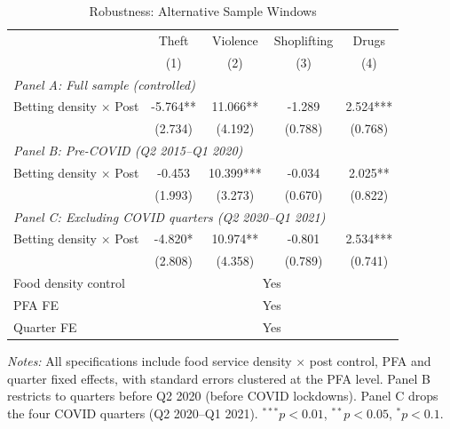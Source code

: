 \begin{table}[htbp]
\centering
\caption{Robustness: Alternative Sample Windows}
\label{tab:robust}
\begin{threeparttable}
\begin{tabular}{lcccc}
\toprule
 & Theft & Violence & Shoplifting & Drugs \\
 & (1) & (2) & (3) & (4) \\
\midrule
\multicolumn{5}{l}{\textit{Panel A: Full sample (controlled)}} \\
 Betting density $\times$ Post & -5.764** & 11.066** & -1.289 & 2.524*** \\
 & (2.734) & (4.192) & (0.788) & (0.768) \\
\midrule
\multicolumn{5}{l}{\textit{Panel B: Pre-COVID (Q2 2015--Q1 2020)}} \\
 Betting density $\times$ Post & -0.453 & 10.399*** & -0.034 & 2.025** \\
 & (1.993) & (3.273) & (0.670) & (0.822) \\
\midrule
\multicolumn{5}{l}{\textit{Panel C: Excluding COVID quarters (Q2 2020--Q1 2021)}} \\
 Betting density $\times$ Post & -4.820* & 10.974** & -0.801 & 2.534*** \\
 & (2.808) & (4.358) & (0.789) & (0.741) \\
\midrule
Food density control & \multicolumn{4}{c}{Yes} \\
PFA FE & \multicolumn{4}{c}{Yes} \\
Quarter FE & \multicolumn{4}{c}{Yes} \\
\bottomrule
\end{tabular}
\begin{tablenotes}[flushleft]\footnotesize
\item \textit{Notes:} All specifications include food service density $\times$ post control, PFA and quarter fixed effects, with standard errors clustered at the PFA level. Panel B restricts to quarters before Q2 2020 (before COVID lockdowns). Panel C drops the four COVID quarters (Q2 2020--Q1 2021). $^{***}p<0.01$, $^{**}p<0.05$, $^{*}p<0.1$.
\end{tablenotes}
\end{threeparttable}
\end{table}
